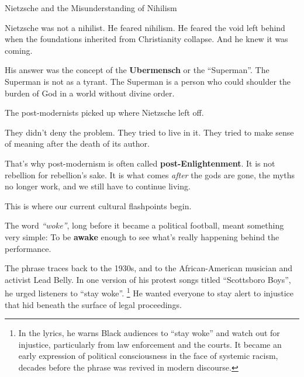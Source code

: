 \begin{HistoricalSidebar}{Nietzsche and the Misunderstanding of Nihilism}
  \medskip
  
  Nietzsche was not a nihilist.  
  He feared nihilism. He feared the void left behind when the foundations inherited from Christianity collapse.  
  And he knew it was coming.

  \medskip
  
  His answer was the concept of the \textbf{Ubermensch} or the ``Superman''. 
  The Superman is not as a tyrant. 
  The Superman is a person who could shoulder the burden of God in a world without divine order.  

  \medskip
  
  The post-modernists picked up where Nietzsche left off.

  \medskip
  
  They didn’t deny the problem.  
  They tried to live in it. 
  They tried to make sense of meaning after the death of its author.

  \medskip
  
  That’s why post-modernism is often called \textbf{post-Enlightenment}.  
  It is not rebellion for rebellion’s sake.  
  It is what comes \textit{after} the gods are gone, the myths no longer work, and we still have to 
  continue living.
  
\end{HistoricalSidebar}

\medskip

This is where our current cultural flashpoints begin.

The word \textit{``woke''}, long before it became a political football, meant something very simple:  
To be \textbf{awake} enough to see what’s really happening behind the performance.

The phrase traces back to the 1930s, and to the African-American musician and activist Lead Belly.  
In one version of his protest songs titled ``Scottsboro Boys'',
he urged listeners to ``stay woke''. \footnote{In the lyrics, he warns Black audiences to “stay woke” and 
watch out for injustice, particularly from law enforcement and the courts. It became an early expression of 
political consciousness in the face of systemic racism, 
decades before the phrase was revived in modern discourse.}
He wanted everyone to stay alert to injustice that hid beneath the 
surface of legal proceedings.

\medskip

